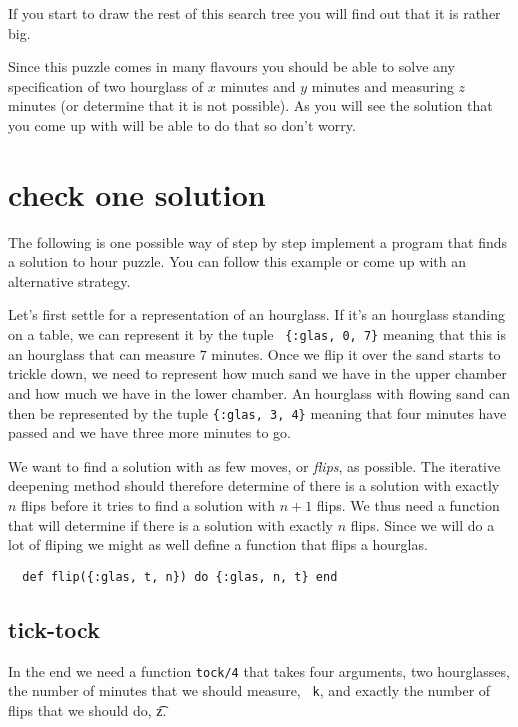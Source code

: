 \documentclass[a4paper,11pt]{article}
\begin{document}
If you start to draw the rest of this search tree you will find out that it is rather big. 








Since this puzzle comes in many flavours you should be able to solve
any specification of two hourglass of $x$ minutes and $y$ minutes and
measuring $z$ minutes (or determine that it is not possible). As you
will see the solution that you come up with will be able to do that so
don't worry.

\section*{check one solution}

The following is one possible way of step by step implement a program
that finds a solution to hour puzzle. You can follow this example or
come up with an alternative strategy.

Let's first settle for a representation of an hourglass. If it's an
hourglass standing on a table, we can represent it by the tuple {\tt
  \{:glas, 0, 7\}} meaning that this is an hourglass that can measure $7$
minutes. Once we flip it over the sand starts to trickle down, we need
to represent how much sand we have in the upper chamber and how much
we have in the lower chamber. An hourglass with flowing sand can then
be represented by the tuple {\tt \{:glas, 3, 4\}} meaning that four
minutes have passed and we have three more minutes to go.


We want to find a solution with as few moves, or {\em flips}, as
possible. The iterative deepening method should therefore determine of
there is a solution with exactly $n$ flips before it tries to find a
solution with $n+1$ flips. We thus need a function that will determine
if there is a solution with exactly $n$ flips. Since we will do a lot
of fliping we might as well define a function that flips a hourglas.

\begin{verbatim}
  def flip({:glas, t, n}) do {:glas, n, t} end  
\end{verbatim}

\subsection*{tick-tock}

In the end we need a function {\tt tock/4} that takes four arguments,
two hourglasses, the number of minutes that we should measure, {\tt
  k}, and exactly the number of flips that we should do, {\t z}.
\end{document}
